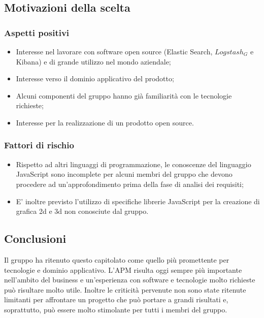 	\subsection{Motivazioni della scelta}
		\subsubsection{Aspetti positivi}
		
			\begin{itemize}
				
				\item Interesse nel lavorare con software open source (Elastic Search, $Logstash_G$ e Kibana) e di grande utilizzo nel mondo aziendale;
				\item Interesse verso il dominio applicativo del prodotto;
				\item Alcuni componenti del gruppo hanno già familiarità con le tecnologie richieste;
				\item Interesse per la realizzazione di un prodotto open source.
			\end{itemize}
		\subsubsection{Fattori di rischio}
			\begin{itemize}
				\item Rispetto ad altri linguaggi di programmazione, le conoscenze del linguaggio JavaScript sono incomplete per alcuni membri del gruppo che devono procedere ad un'approfondimento prima della fase di analisi dei requisiti;
				\item E' inoltre previsto l'utilizzo di specifiche librerie JavaScript per la creazione di grafica 2d e 3d non conosciute dal gruppo.
			\end{itemize}
	\subsection{Conclusioni}	
	Il gruppo ha ritenuto questo capitolato come quello più promettente per tecnologie e dominio applicativo. L'APM risulta oggi sempre più importante nell'ambito del business e un'esperienza con software e tecnologie molto richieste può risultare molto utile. Inoltre le criticità pervenute non sono state ritenute limitanti per affrontare un progetto che può portare a grandi risultati e, soprattutto, può essere molto stimolante per tutti i membri del gruppo.
			 